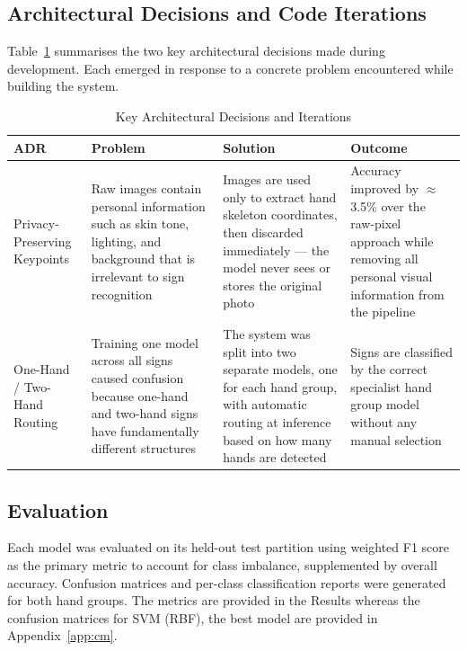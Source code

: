 \documentclass[conference]{IEEEtran}
\begin{document}
\subsection{Architectural Decisions and Code Iterations}

Table~\ref{tab:adr} summarises the two key architectural decisions made during development. Each emerged in response to a concrete problem encountered while building the system.

\begin{table}[t]
  \caption{Key Architectural Decisions and Iterations}
  \label{tab:adr}
  \centering
  \begin{tabular}{p{3cm} p{4.5cm} p{4.5cm} p{4cm}}
    \toprule
    \textbf{ADR} & \textbf{Problem} & \textbf{Solution} & \textbf{Outcome} \\
    \midrule
    Privacy-Preserving Keypoints &
      Raw images contain personal information such as skin tone, lighting, and background that is irrelevant to sign recognition &
      Images are used only to extract hand skeleton coordinates, then discarded immediately --- the model never sees or stores the original photo &
      Accuracy improved by $\approx$3.5\% over the raw-pixel approach while removing all personal visual information from the pipeline \\
    \addlinespace
    One-Hand / Two-Hand Routing &
      Training one model across all signs caused confusion because one-hand and two-hand signs have fundamentally different structures &
      The system was split into two separate models, one for each hand group, with automatic routing at inference based on how many hands are detected &
      Signs are classified by the correct specialist hand group model without any manual selection \\
    \bottomrule
  \end{tabular}
\end{table}

\subsection{Evaluation}

Each model was evaluated on its held-out test partition using weighted F1 score as the primary metric to account for class imbalance, supplemented by overall accuracy. Confusion matrices and per-class classification reports were generated for both hand groups. The metrics are provided in the Results whereas the confusion matrices for SVM (RBF), the best model are provided in Appendix~\ref{app:cm}.
\end{document}
